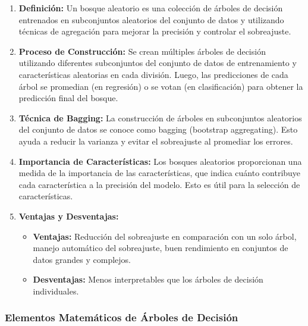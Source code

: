 \documentclass{article}
\begin{document}
\begin{enumerate}
    \item \textbf{Definición:}
        Un bosque aleatorio es una colección de árboles de decisión entrenados en subconjuntos aleatorios del conjunto de datos y utilizando técnicas de agregación para mejorar la precisión y controlar el sobreajuste.

    \item \textbf{Proceso de Construcción:}
        Se crean múltiples árboles de decisión utilizando diferentes subconjuntos del conjunto de datos de entrenamiento y características aleatorias en cada división. Luego, las predicciones de cada árbol se promedian (en regresión) o se votan (en clasificación) para obtener la predicción final del bosque.

    \item \textbf{Técnica de Bagging:}
        La construcción de árboles en subconjuntos aleatorios del conjunto de datos se conoce como bagging (bootstrap aggregating). Esto ayuda a reducir la varianza y evitar el sobreajuste al promediar los errores.

    \item \textbf{Importancia de Características:}
        Los bosques aleatorios proporcionan una medida de la importancia de las características, que indica cuánto contribuye cada característica a la precisión del modelo. Esto es útil para la selección de características.

    \item \textbf{Ventajas y Desventajas:}
        \begin{itemize}
            \item \textbf{Ventajas:} Reducción del sobreajuste en comparación con un solo árbol, manejo automático del sobreajuste, buen rendimiento en conjuntos de datos grandes y complejos.
            \item \textbf{Desventajas:} Menos interpretables que los árboles de decisión individuales.
        \end{itemize}
\end{enumerate}

\subsubsection{Elementos Matemáticos de Árboles de Decisión}
\end{document}
